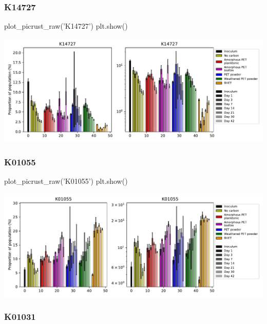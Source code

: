 \documentclass[
]{article}
\newenvironment{Shaded}{\begin{snugshade}}{\end{snugshade}}
\newcommand{\NormalTok}[1]{#1}
\newcommand{\StringTok}[1]{\textcolor[rgb]{0.31,0.60,0.02}{#1}}
\begin{document}
\hypertarget{k14727}{%
\subsubsection{K14727}\label{k14727}}

\begin{Shaded}
\begin{Highlighting}[]
\NormalTok{plot_picrust_raw(}\StringTok{'K14727'}\NormalTok{)}
\NormalTok{plt.show()}
\end{Highlighting}
\end{Shaded}

\includegraphics{20-6-15-PET-plastisphere-PICRUSt2_files/figure-latex/plot_raw_K14727-1.pdf}

\hypertarget{k01055}{%
\subsubsection{K01055}\label{k01055}}

\begin{Shaded}
\begin{Highlighting}[]
\NormalTok{plot_picrust_raw(}\StringTok{'K01055'}\NormalTok{)}
\NormalTok{plt.show()}
\end{Highlighting}
\end{Shaded}

\includegraphics{20-6-15-PET-plastisphere-PICRUSt2_files/figure-latex/plot_raw_K01055-1.pdf}

\hypertarget{k01031}{%
\subsubsection{K01031}\label{k01031}}
\end{document}
